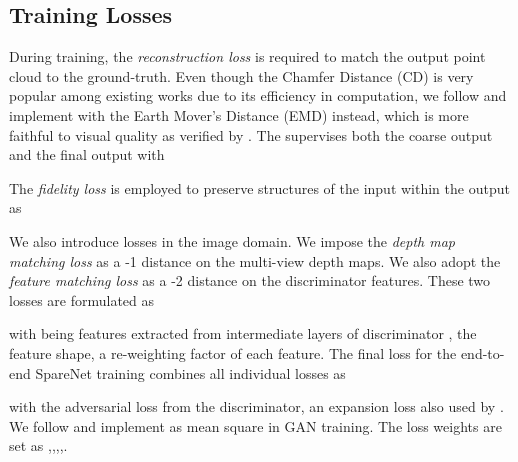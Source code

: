 \documentclass[final]{cvpr}
\begin{document}
\subsection{Training Losses}

During training, the \emph{reconstruction loss}  is required to match the output point cloud to the ground-truth. 
Even though the Chamfer Distance (CD) is very popular among existing works due to its efficiency in computation,
we follow \cite{liu2019morphing} and implement  with the Earth Mover's Distance (EMD) instead, which is more faithful to visual quality as verified by \cite{fan2017pointsetgeneration,achlioptas2018learning,liu2019morphing}. The  supervises both the coarse output  and the final output  with
\vspace{-0.5em}

The \emph{fidelity loss}  is employed to preserve structures of the input  within the output  as
\vspace{-0.5em}

We also introduce losses in the image domain. We impose the \emph{depth map matching loss}  as a -1 distance on the multi-view depth maps. We also adopt the \emph{feature matching loss}  as a -2 distance on the discriminator features. These two losses are formulated as
\vspace{-0.5em}


with  being features extracted from intermediate layers of discriminator ,
 the feature shape,  a re-weighting factor of each feature.
The final loss for the end-to-end SpareNet training combines all individual losses as
 
with  the adversarial loss from the discriminator,  an expansion loss also used by \cite{liu2019morphing}. We follow \cite{mao2017least} and implement  as mean square in GAN training. The loss weights are set as 
,,,,.
\end{document}

